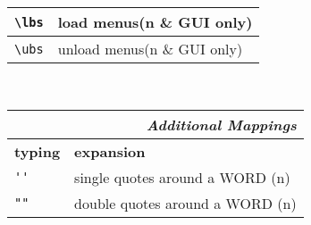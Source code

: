 \documentclass[oneside,11pt,a4paper,DIV18]{scrartcl}
\begin{document}
\begin{center}
\begin{tabular}[]{|p{11mm}|p{59mm}|}
\hline \verb'\lbs'  & load    menus\hfill \scriptsize{(n \& GUI only)}\\
\hline \verb'\ubs'  & unload  menus\hfill \scriptsize{(n \& GUI only)}\\
\hline 
\end{tabular}\\%
%
\begin{minipage}[b]{70mm}%
\setlength{\fboxsep}{.25mm}%
\begin{spacing}{1.1}%
\begin{tabular}[]{|p{11mm}|p{55mm}|}%
\hline
\multicolumn{2}{|r|}{\textsl{Additional Mappings}}\\
\hline
\hline \textbf{typing}& \textbf{expansion}\\
\hline \verb"''"      & single quotes around a WORD    \hfill (n)\\
\hline \verb'""'      & double quotes around a WORD    \hfill (n)\\
\hline
\end{tabular}
\end{spacing}
\end{minipage}%
%
\end{center}
\end{document}
